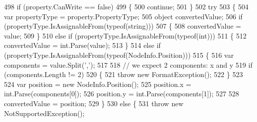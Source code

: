\begin{DoxyCode}
498                                     \textcolor{keywordflow}{if} (property.CanWrite == \textcolor{keyword}{false})
499                                     \{
500                                         \textcolor{keywordflow}{continue};
501                                     \}
502                                     \textcolor{keywordflow}{try}
503                                     \{
504                                         var propertyType = property.PropertyType;
505                                         \textcolor{keywordtype}{object} convertedValue;
506                                         \textcolor{keywordflow}{if} (propertyType.IsAssignableFrom(typeof(\textcolor{keywordtype}{string})))
507                                         \{
508                                             convertedValue = value;
509                                         \}
510                                         \textcolor{keywordflow}{else} \textcolor{keywordflow}{if} (propertyType.IsAssignableFrom(typeof(\textcolor{keywordtype}{int})))
511                                         \{
512                                             convertedValue = int.Parse(value);
513                                         \}
514                                         \textcolor{keywordflow}{else} \textcolor{keywordflow}{if} (propertyType.IsAssignableFrom(typeof(NodeInfo.Position)))
515                                         \{
516                                             var components = value.Split(\textcolor{charliteral}{','});
517 
518                                             \textcolor{comment}{// we expect 2 components: x and y}
519                                             \textcolor{keywordflow}{if} (components.Length != 2)
520                                             \{
521                                                 \textcolor{keywordflow}{throw} \textcolor{keyword}{new} FormatException();
522                                             \}
523 
524                                             var position = \textcolor{keyword}{new} NodeInfo.Position();
525                                             position.x = int.Parse(components[0]);
526                                             position.y = int.Parse(components[1]);
527 
528                                             convertedValue = position;
529                                         \}
530                                         \textcolor{keywordflow}{else} \{
531                                             \textcolor{keywordflow}{throw} \textcolor{keyword}{new} NotSupportedException();

\end{DoxyCode}
